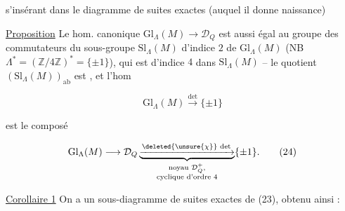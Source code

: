 s'insérant dans le diagramme de suites exactes (auquel il donne naissance)


\uline{Proposition} Le hom. canonique $\mathrm{Gl}_{\Lambda}(M)\to\mathcal D_Q$  est aussi égal au groupe des commutateurs du sous-groupe  $\mathrm{Sl}_{\Lambda}(M)$ d'indice $2$ de $\mathrm{Gl}_{\Lambda}(M)$ (NB $\Lambda^*=(\mathbb Z/4\mathbb Z)^*=\{\pm1\}$), qui est  d'indice $4$ dans $\mathrm{Sl}_{\Lambda}(M)$ -- le quotient $(\mathrm{Sl}_{\Lambda}(M))_{\mathrm{ab}}$ est  , et l'hom

\[
\mathrm{Gl}_{\Lambda}(M)\xrightarrow{\det}\{\pm1\}
\]

est le composé 

\[
\mathrm{Gl}_{\Lambda}(M)\longrightarrow\mathcal D_Q
\underbrace{\xrightarrow{\deleted{\unsure{\chi}}\,\det}}_{\substack{\text{noyau }\mathcal D_Q^+,\\\text{cyclique d'ordre }4}}\{\pm1\}. \tag*{(24)}
\]

\uline{Corollaire 1} On a un sous-diagramme de suites exactes de (23), obtenu ainsi :
